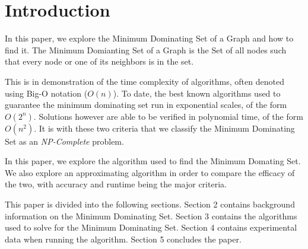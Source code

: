 \documentclass[paper.tex]{subfiles}
\begin{document}
\section{Introduction}

In this paper, we explore the Minimum Dominating Set of a Graph and how to find it.
The Minimum Domianting Set of a Graph is the Set of all nodes such that every node or one of its neighbors is in the set.

This is in demonstration of the time complexity of algorithms, often denoted using Big-O notation ($O(n)$).
To date, the best known algorithms used to guarantee the minimum dominating set run in exponential scales, of the form $O(2^n)$.
Solutions however are able to be verified in polynomial time, of the form $O(n^2)$.
It is with these two criteria that we classify the Minimum Dominating Set as an \textit{NP-Complete} problem.

In this paper, we explore the algorithm used to find the Minimum Domating Set.
We also explore an approximating algorithm in order to compare the efficacy of the two, with accuracy and runtime being the major criteria.

This paper is divided into the following sections. 
Section 2 contains background information on the Minimum Dominating Set.
Section 3 contains the algorithms used to solve for the Minimum Dominating Set.
Section 4 contains experimental data when running the algorithm.
Section 5 concludes the paper.
\end{document}

